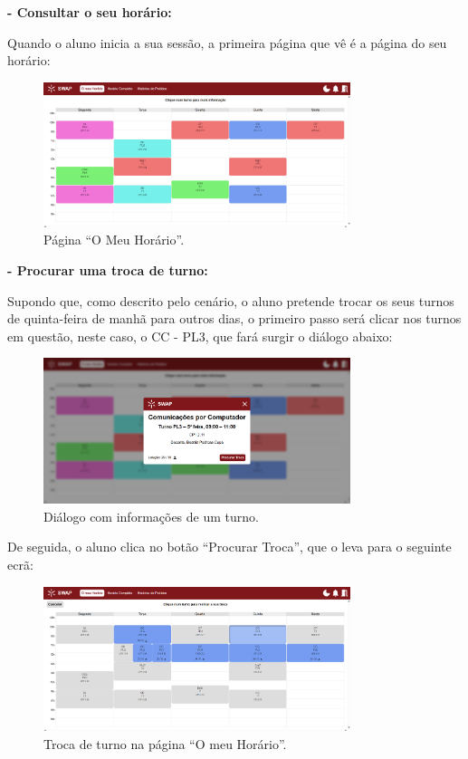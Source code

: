 \documentclass[12pt, a4paper]{article}
\begin{document}
\textbf{- Consultar o seu horário:}

Quando o aluno inicia a sua sessão, a primeira página que vê é a página do seu horário:

\begin{figure}[H]
    \centering
    \includegraphics[width=0.8\textwidth]{res/manual/pagina_o_meu_horario.png}
    \caption{Página ``O Meu Horário''.}
    \label{meu_horario}
\end{figure}

\textbf{- Procurar uma troca de turno:}

Supondo que, como descrito pelo cenário, o aluno pretende trocar os seus turnos de quinta-feira de
manhã para outros dias, o primeiro passo será clicar nos turnos em questão, neste caso, o CC - PL3,
que fará surgir o diálogo abaixo:

\begin{figure}[H]
    \centering
    \includegraphics[width=0.8\textwidth]{res/manual/popup_turno_meu_horario.png}
    \caption{Diálogo com informações de um turno.}
    \label{popup_turno}
\end{figure}

De seguida, o aluno clica no botão ``Procurar Troca'', que o leva para o seguinte ecrã:

\begin{figure}[H]
    \centering
    \includegraphics[width=0.8\textwidth]{res/manual/pagina_procura_troca_meu_horario.png}
    \caption{Troca de turno na página ``O meu Horário''.}
    \label{procura_troca}
\end{figure}
\end{document}
